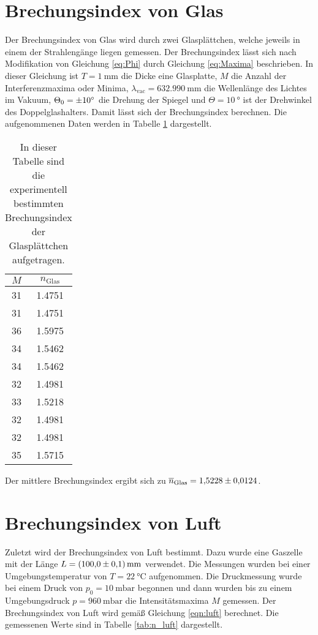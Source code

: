 \section{Brechungsindex von Glas}
\label{sec:n_glas}
Der Brechungsindex von Glas wird durch zwei Glasplättchen, welche jeweils in einem der Strahlengänge liegen gemessen. Der Brechungsindex lässt sich nach Modifikation von Gleichung 
\ref{eq:Phi} durch Gleichung \ref{eq:Maxima} beschrieben. In dieser Gleichung ist $T = \qty{1}{\milli\metre}$ die Dicke eine Glasplatte, $M$ die Anzahl der Interferenzmaxima oder 
Minima, $\lambda_\mathrm{vac} = \qty{632.990}{\milli\metre}$ die Wellenlänge des Lichtes im Vakuum, $\Theta_0 = \qty{\pm 10}{\degree}$ die Drehung der Spiegel und 
$\Theta = \qty{10}{\degree}$ ist der Drehwinkel des Doppelglashalters. Damit lässt sich der Brechungsindex berechnen. Die aufgenommenen Daten werden in Tabelle \ref{tab:n_glas} 
dargestellt.

\begin{table}[htbp] 
  \centering 
  \begin{tabular}{c c} 
      \toprule $M$ & $n_\mathrm{Glas}$\\ 
      \midrule 
      31 & 1.4751 \\
      31 & 1.4751 \\
      36 & 1.5975 \\
      34 & 1.5462 \\
      34 & 1.5462 \\
      32 & 1.4981 \\
      33 & 1.5218 \\
      32 & 1.4981 \\
      32 & 1.4981 \\
      35 & 1.5715 \\

      \bottomrule 
  \end{tabular} 
  \caption[Tabelle]{In dieser Tabelle sind die experimentell bestimmten Brechungsindex der Glasplättchen aufgetragen.} 
  \label{tab:n_glas} 
\end{table}

Der mittlere Brechungsindex ergibt sich zu $\overline{n}_\mathrm{Glas} = \num{1.5228 \pm 0.0124}$.

\section{Brechungsindex von Luft}
\label{sec:n_luft}
Zuletzt wird der Brechungsindex von Luft bestimmt. Dazu wurde eine Gaszelle mit der Länge $L = \qty{100 \pm 0.1}{\milli\metre}$ verwendet. Die Messungen wurden bei einer Umgebungstemperatur 
von $T = \qty{22}{\celsius}$ aufgenommen. Die Druckmessung wurde bei einem Druck von 
$p_0 = \qty{10}{\milli\bar}$ begonnen und dann wurden bis zu einem Umgebungsdruck $p = \qty{960}{\milli\bar}$ die Intensitätsmaxima $M$ gemessen. Der Brechungsindex von Luft wird gemäß 
Gleichung \ref{eqn:luft} berechnet. Die gemessenen Werte sind in Tabelle \ref{tab:n_luft} dargestellt.

